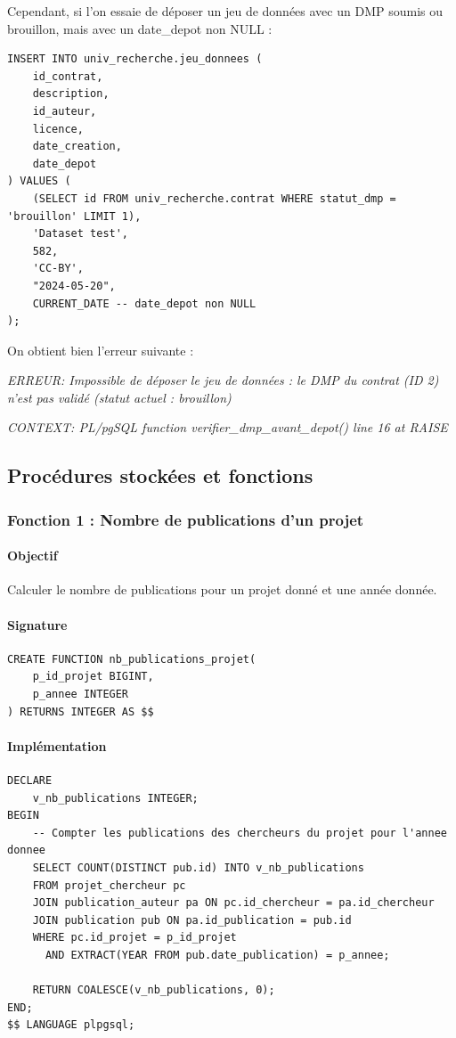 \documentclass[12pt,a4paper]{article}
\begin{document}
Cependant, si l'on essaie de déposer un jeu de données avec un DMP soumis ou brouillon, mais avec un date\_depot non NULL :

\begin{lstlisting}[style=sqlstyle, caption=Test échoué du trigger vérification DMP]
INSERT INTO univ_recherche.jeu_donnees (
    id_contrat, 
    description, 
    id_auteur, 
    licence, 
    date_creation,
    date_depot
) VALUES (
    (SELECT id FROM univ_recherche.contrat WHERE statut_dmp = 'brouillon' LIMIT 1),
    'Dataset test',
    582,
    'CC-BY',
    "2024-05-20",
    CURRENT_DATE -- date_depot non NULL
);
\end{lstlisting}
On obtient bien l'erreur suivante :

\textit{ERREUR: Impossible de déposer le jeu de données : le DMP du contrat (ID 2) n'est pas validé (statut actuel : brouillon)}

\textit{CONTEXT:  PL/pgSQL function verifier\_dmp\_avant\_depot() line 16 at RAISE }

\subsection{Procédures stockées et fonctions}

\subsubsection{Fonction 1 : Nombre de publications d'un projet}

\paragraph{Objectif}
Calculer le nombre de publications pour un projet donné et une année donnée.

\paragraph{Signature}
\begin{lstlisting}[style=sqlstyle, caption=Signature de la fonction]
CREATE FUNCTION nb_publications_projet(
    p_id_projet BIGINT,
    p_annee INTEGER
) RETURNS INTEGER AS $$
\end{lstlisting}

\paragraph{Implémentation}
\begin{lstlisting}[style=sqlstyle, caption=Fonction nb\_publications\_projet]
DECLARE
    v_nb_publications INTEGER;
BEGIN
    -- Compter les publications des chercheurs du projet pour l'annee donnee
    SELECT COUNT(DISTINCT pub.id) INTO v_nb_publications
    FROM projet_chercheur pc
    JOIN publication_auteur pa ON pc.id_chercheur = pa.id_chercheur
    JOIN publication pub ON pa.id_publication = pub.id
    WHERE pc.id_projet = p_id_projet
      AND EXTRACT(YEAR FROM pub.date_publication) = p_annee;
    
    RETURN COALESCE(v_nb_publications, 0);
END;
$$ LANGUAGE plpgsql;
\end{lstlisting}
\end{document}
